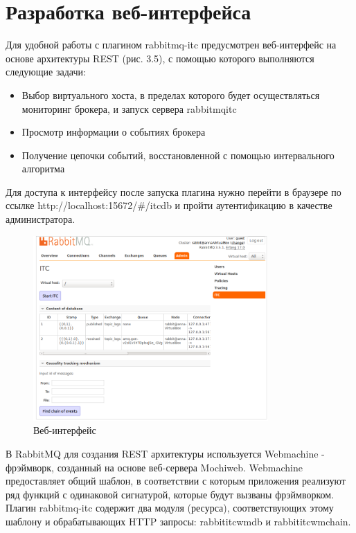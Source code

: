 {\section{Разработка веб-интерфейса}
Для удобной работы с плагином rabbitmq-itc предусмотрен веб-интерфейс  на основе архитектуры REST (рис. 3.5), с помощью которого выполняются следующие задачи:
\begin{itemize}
\item Выбор виртуального хоста, в пределах которого будет осуществляться мониторинг брокера, и запуск сервера rabbitmq\underline{\hspace{0.25cm}}itc
\item Просмотр информации о событиях брокера
\item Получение цепочки событий, восстановленной с помощью интервального алгоритма
\end{itemize}
Для доступа к интерфейсу после запуска плагина нужно перейти в браузере по ссылке  http://localhost:15672/\#/itc\underline{\hspace{0.25cm}}db и пройти аутентификацию в качестве администратора.\par
\begin{figure}
\centering
\includegraphics[width=0.8\textwidth]{img/web.png}
\caption{Веб-интерфейс}
\end{figure}
В RabbitMQ для создания REST архитектуры используется Webmachine - фрэймворк, созданный на основе веб-сервера Mochiweb. Webmachine предоставляет общий шаблон, в соответствии с которым приложения реализуют ряд функций с одинаковой сигнатурой, которые будут вызваны фрэймворком. Плагин rabbitmq-itc содержит два модуля (ресурса), соответствующих этому шаблону и обрабатывающих HTTP запросы: rabbit\underline{\hspace{0.25cm}}itc\underline{\hspace{0.25cm}}wm\underline{\hspace{0.25cm}}db и rabbit\underline{\hspace{0.25cm}}itc\underline{\hspace{0.25cm}}wm\underline{\hspace{0.25cm}}chain.\par
}
